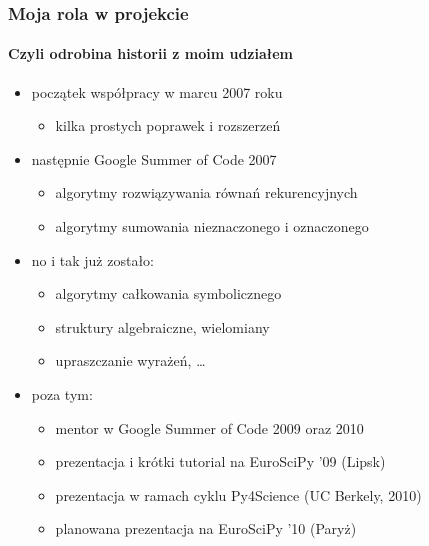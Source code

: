 \documentclass{beamer}
\begin{document}
\begin{frame}
    \frametitle{Moja rola w projekcie}
    \framesubtitle{Czyli odrobina historii z moim udziałem}

    \begin{itemize}
        \item początek współpracy w marcu 2007 roku
            \begin{itemize}
                \item kilka prostych poprawek i rozszerzeń
            \end{itemize}
            \pause
        \item następnie Google Summer of Code 2007
            \begin{itemize}
                \item algorytmy rozwiązywania równań rekurencyjnych
                \item algorytmy sumowania nieznaczonego i oznaczonego
            \end{itemize}
            \pause
        \item no i tak już zostało:
            \begin{itemize}
                \item algorytmy całkowania symbolicznego
                \item struktury algebraiczne, wielomiany
                \item upraszczanie wyrażeń, \ldots
            \end{itemize}
            \pause
        \item poza tym:
            \begin{itemize}
                \item mentor w Google Summer of Code 2009 oraz 2010
                \pause
                \item prezentacja i krótki tutorial na EuroSciPy '09 (Lipsk)
                \pause
                \item prezentacja w ramach cyklu Py4Science (UC Berkely, 2010)
                \pause
                \item planowana prezentacja na EuroSciPy '10 (Paryż)
            \end{itemize}
    \end{itemize}
\end{frame}
\end{document}
